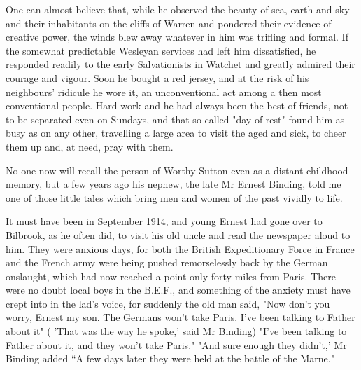 One can almost believe that, while he observed the beauty of sea, earth and sky and their inhabitants on the cliffs of Warren and pondered their evidence of creative power, the winds blew away whatever in him was trifling and formal. If the somewhat predictable Wesleyan services had left him dissatisfied, he responded readily to the early Salvationists in Watchet and greatly admired their courage and vigour. Soon he bought a red jersey, and at the risk of his neighbours' ridicule he wore it, an unconventional act among a then most conventional people. Hard work and he had always been the best of friends, not to be separated even on Sundays, and that so called "day of rest" found him as busy as on any other, travelling a large area to visit the aged and sick, to cheer them up and, at need, pray with them. 

No one now will recall the person of Worthy Sutton even as a distant childhood memory, but a few years ago his nephew, the late Mr Ernest Binding, told me one of those little tales which bring men and women of the past vividly to life. 

It must have been in September 1914, and young Ernest had gone over to Bilbrook, as he often did, to visit his old uncle and read the newspaper aloud to him. They were anxious days, for both the British Expeditionary Force in France and the French army were being pushed remorselessly back by the German onslaught, which had now reached a point only forty miles from Paris. There were no doubt local boys in the B.E.F., and something of the anxiety must have crept into in the lad's voice, for suddenly the old man said, "Now don't you worry, Ernest my son. The Germans won't take Paris. I've been talking to Father about it" ( 'That was the way he spoke,' said Mr Binding) "I've been talking to Father about it, and they won't take Paris."   "And sure enough they didn't,' Mr Binding added “A few days later they were held at the battle of the Marne."